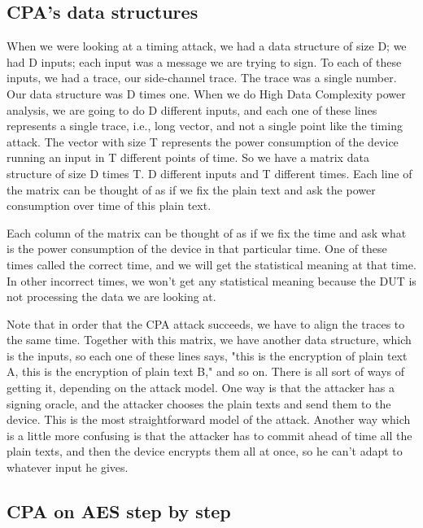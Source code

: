 \subsection{CPA's data structures}\label{c8_CPA_data_structures:subsec}

When we were looking at a timing attack, we had a data structure of size D; we
had D inputs; each input was a message we are trying to sign. To each of these
inputs, we had a trace, our side-channel trace. The trace was a single number.
Our data structure was D times one. When we do High Data Complexity power
analysis, we are going to do D different inputs, and each one of these lines
represents a single trace, i.e., long vector, and not a single point like the
timing attack. The vector with size T represents the power consumption of the device
running an input in T different points of time. So we have a matrix data
structure of size D times T. D different inputs and T different times. Each line
of the matrix can be thought of as if we fix the plain text and ask the power
consumption over time of this plain text.

Each column of the matrix can be thought of as if we fix the time and ask what is the
power consumption of the device in that particular time. One of these times
called the correct time, and we will get the statistical meaning at that time. In
other incorrect times, we won't get any statistical meaning because the DUT is
not processing the data we are looking at.

Note that in order that the CPA attack succeeds, we have to align the traces to
the same time. Together with this matrix, we have another data structure, which is
the inputs, so each one of these lines says, "this is the encryption of plain
text A, this is the encryption of plain text B," and so on. There is all sort of
ways of getting it, depending on the attack model. One way is that the attacker
has a signing oracle, and the attacker chooses the plain texts and send them to
the device. This is the most straightforward model of the attack. Another way which is a
little more confusing is that the attacker has to commit ahead of time all the
plain texts, and then the device encrypts them all at once, so he can't adapt to
whatever input he gives.

\subsection{CPA on AES step by step}\label{c8_CPA_overview:subsec}

